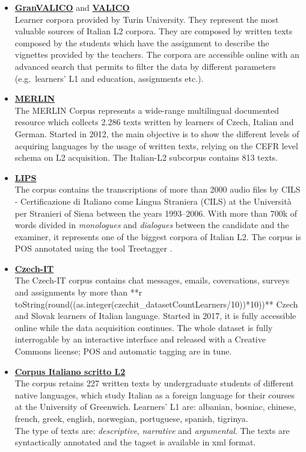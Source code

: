 \documentclass[
  a4paper,
  twoside,
  12pt,
  chapterprefix=false,
  bibliography=totocnumbered,
  listof=flat]{scrbook}
\begin{document}
\begin{itemize}
\item
  \textbf{\href{http://www.valico.org/valico_b_CORPUS.html}{GranVALICO}} and \textbf{\href{http://www.valico.org/valico_CORPUS.html}{VALICO}} \citep{valico}\\
  Learner corpora provided by Turin University. They represent the most valuable sources of Italian L2 corpora. They are composed by written texts composed by the students which have the assignment to describe the vignettes provided by the teachers. The corpora are accessible online with an advanced search that permits to filter the data by different parameters (e.g.~learners' L1 and education, assignments etc.).
\item
  \textbf{\href{http://merlin-platform.eu}{MERLIN}} \citep{merlin}\\
  The MERLIN Corpus represents a wide-range multilingual documented resource which collects 2.286 texts written by learners of Czech, Italian and German.
  Started in 2012, the main objective is to show the different levels of acquiring languages by the usage of written texts, relying on the CEFR level schema on L2 acquisition.
  The Italian-L2 subcorpus contains 813 texts.
\item
  \textbf{\href{http://parlaritaliano.it/index.php/en/data/653-corpus-lips}{LIPS}} \citep{lips}\\
  The corpus contains the transcriptions of more than 2000 audio files by CILS - Certificazione di Italiano come Lingua Straniera (CILS) at the Università per Stranieri of Siena between the years 1993--2006.
  With more than 700k of words divided in \emph{monologues} and \emph{dialogues} between the candidate and the examiner, it represents one of the biggest corpora of Italian L2. The corpus is POS annotated using the tool Treetagger \citep{schmid1994}.
\item
  \textbf{\href{http://czech-it.github.io}{Czech-IT}} \citep{czech-it}\\
  The Czech-IT corpus contains chat messages, emails, coversations, surveys and assignments by more than **r toString(round((as.integer(czechit\_datasetCountLearners/10))*10))** Czech and Slovak learners of Italian language.
  Started in 2017, it is fully accessible online while the data acquisition continues. The whole dataset is fully interrogable by an interactive interface and released with a Creative Commons license; POS and automatic tagging are in tune.
\item
  \textbf{\href{http://www.parlaritaliano.it/index.php/it/corpora-di-parlato/662-corpus-italiano-scritto-l2}{Corpus Italiano scritto L2}} \citep{vogheraturco2010}\\
  The corpus retains 227 written texts by undergraduate students of different native languages, which study Italian as a foreign language for their courses at the University of Greenwich.
  Learners' L1 are: albanian, bosniac, chinese, french, greek, english, norwegian, portuguese, spanish, tigrinya.\\
  The type of texts are: \emph{descriptive}, \emph{narrative} and \emph{argumental}.
  The texts are syntactically annotated and the tagset is available in xml format.
\end{itemize}
\end{document}
